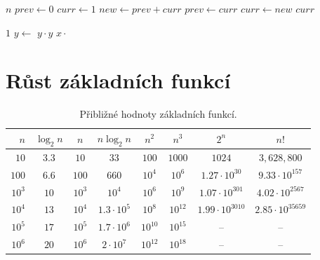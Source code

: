 \documentclass[openany,12pt,a4paper]{book}
\begin{document}
\begin{algorithm}[H]
\caption{Výpočet $n$-tého Fibonacciho čísla}
\begin{algorithmic}
        \State \Return $n$
    \EndIf
    \State $prev \gets 0$
    \State $curr \gets 1$
        \State $new \gets prev + curr$
        \State $prev \gets curr$
        \State $curr \gets new$
    \EndFor
    \State \Return $curr$
\EndFunction
\end{algorithmic}
\end{algorithm}

\begin{algorithm}[H]
\caption{Rychlé mocnění}
\begin{algorithmic}
        \State \Return $1$
        \State $y \gets$ 
        \State \Return $y \cdot y$
    \Else
        \State \Return $x \cdot$ 
    \EndIf
\EndFunction
\end{algorithmic}
\end{algorithm}

\section{Růst základních funkcí}

\begin{table}[h!]
\centering
\begin{tabular}{rccccccc}
\toprule
$n$ & $\log_2 n$ & $n$ & $n \log_2 n$ & $n^2$ & $n^3$ & $2^n$ & $n!$ \\
\midrule
$10$   & $3.3$ & $10$ & $33$ & $100$ & $1000$ & $1024$ & $3{,}628{,}800$ \\
$100$  & $6.6$ & $100$ & $660$ & $10^4$ & $10^6$ & $1.27\cdot10^{30}$ & $9.33\cdot10^{157}$ \\
$10^3$ & $10$ & $10^3$ & $10^4$ & $10^6$ & $10^9$ & $1.07\cdot10^{301}$ & $4.02\cdot10^{2567}$ \\
$10^4$ & $13$ & $10^4$ & $1.3\cdot10^5$ & $10^8$ & $10^{12}$ & $1.99\cdot10^{3010}$ & $2.85\cdot10^{35659}$ \\
$10^5$ & $17$ & $10^5$ & $1.7\cdot10^6$ & $10^{10}$ & $10^{15}$ & -- & -- \\
$10^6$ & $20$ & $10^6$ & $2\cdot10^7$ & $10^{12}$ & $10^{18}$ & -- & -- \\
\bottomrule
\end{tabular}
\caption{Přibližné hodnoty základních funkcí.}
\end{table}
\end{document}
